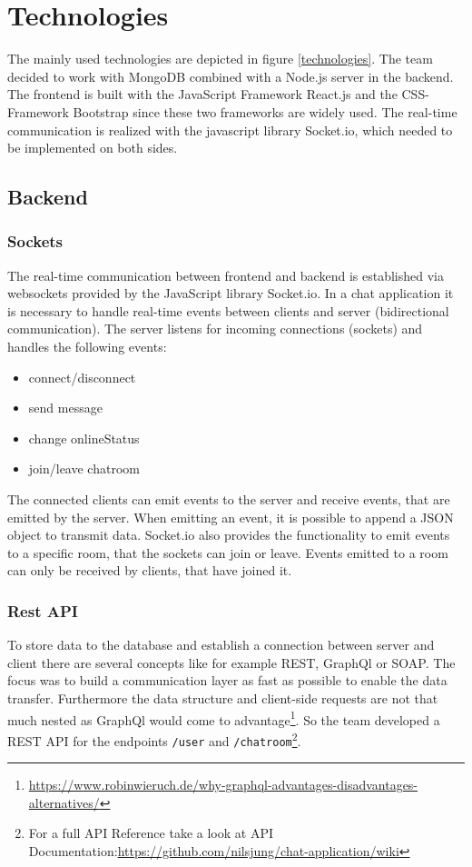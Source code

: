\section{Technologies}
The mainly used technologies are depicted in figure \ref{technologies}.
The team decided to work with MongoDB combined with a Node.js server in the backend. The frontend is built with the JavaScript Framework React.js and the CSS-Framework Bootstrap since these two frameworks are widely used.
The real-time communication is realized with the javascript library Socket.io, which needed to be implemented on both sides.

\subsection{Backend}
\subsubsection{Sockets}
The real-time communication between frontend and backend is established via websockets provided by the JavaScript library Socket.io.
In a chat application it is necessary to handle real-time events between clients and server (bidirectional communication).
The server listens for incoming connections (sockets) and handles the following events:

\begin{itemize}
	\item connect/disconnect
	\item send message
	\item change onlineStatus
	\item join/leave chatroom
\end{itemize}

The connected clients can emit events to the server and receive events, that are emitted by the server. When emitting an event, it is possible to append a JSON object to transmit data.
Socket.io also provides the functionality to emit events to a specific room, that the sockets can join or leave. Events emitted to a room can only be received by clients, that have joined it.

\subsubsection{Rest API}
To store data to the database and establish a connection between server and client there are several concepts like for example REST, GraphQl or SOAP. The focus was to build a communication layer as fast as possible to enable the data transfer. Furthermore the data structure and client-side requests are not that much nested as GraphQl would come to advantage\footnote{\url{https://www.robinwieruch.de/why-graphql-advantages-disadvantages-alternatives/}}. So the team developed a REST API for the endpoints \texttt{/user} and \texttt{/chatroom}\footnote{For a full API Reference take a look at API Documentation:\url{https://github.com/nilsjung/chat-application/wiki}}. 

